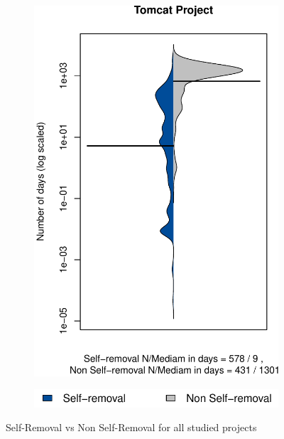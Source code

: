 \begin{figure}[t]
\begin{subfigure}[b]{0.195\textwidth}
		\includegraphics[width=\textwidth]{figures/test/Tomcat.pdf}
		\label{fig:removal_comparison_tomcat} 
	\end{subfigure}
	\begin{subfigure}[b]{0.30\textwidth}
		\includegraphics[width=\textwidth]{figures/test/legend_.pdf}
	\end{subfigure}
	\caption{Self-Removal vs Non Self-Removal for all studied projects}
	\label{fig:removal_self_vs_nonself}
\end{figure}





